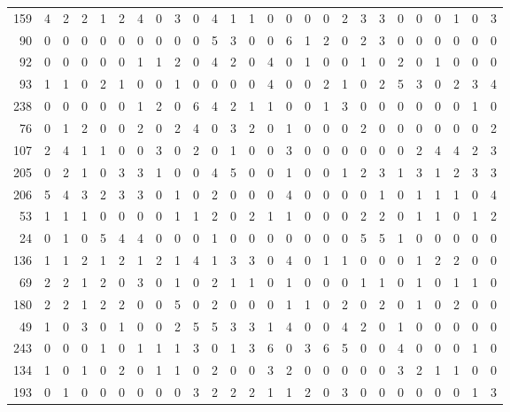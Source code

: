 \begin{longtable}{@{\extracolsep{\fill}}rccccccccccccccccccccccccc@{}}
159 & 4 & 2 & 2 & 1 & 2 & 4 & 0 & 3 & 0 & 4 & 1 & 1 & 0 & 0 & 0 & 0 & 2 & 3 & 3 & 0 & 0 & 0 & 1 & 0 & 3 \\
90 & 0 & 0 & 0 & 0 & 0 & 0 & 0 & 0 & 0 & 5 & 3 & 0 & 0 & 6 & 1 & 2 & 0 & 2 & 3 & 0 & 0 & 0 & 0 & 0 & 0 \\
92 & 0 & 0 & 0 & 0 & 0 & 1 & 1 & 2 & 0 & 4 & 2 & 0 & 4 & 0 & 1 & 0 & 0 & 1 & 0 & 2 & 0 & 1 & 0 & 0 & 0 \\
93 & 1 & 1 & 0 & 2 & 1 & 0 & 0 & 1 & 0 & 0 & 0 & 0 & 4 & 0 & 0 & 2 & 1 & 0 & 2 & 5 & 3 & 0 & 2 & 3 & 4 \\
238 & 0 & 0 & 0 & 0 & 0 & 1 & 2 & 0 & 6 & 4 & 2 & 1 & 1 & 0 & 0 & 1 & 3 & 0 & 0 & 0 & 0 & 0 & 0 & 1 & 0 \\
76 & 0 & 1 & 2 & 0 & 0 & 2 & 0 & 2 & 4 & 0 & 3 & 2 & 0 & 1 & 0 & 0 & 0 & 2 & 0 & 0 & 0 & 0 & 0 & 0 & 2 \\
107 & 2 & 4 & 1 & 1 & 0 & 0 & 3 & 0 & 2 & 0 & 1 & 0 & 0 & 3 & 0 & 0 & 0 & 0 & 0 & 0 & 2 & 4 & 4 & 2 & 3 \\
205 & 0 & 2 & 1 & 0 & 3 & 3 & 1 & 0 & 0 & 4 & 5 & 0 & 0 & 1 & 0 & 0 & 1 & 2 & 3 & 1 & 3 & 1 & 2 & 3 & 3 \\
206 & 5 & 4 & 3 & 2 & 3 & 3 & 0 & 1 & 0 & 2 & 0 & 0 & 0 & 4 & 0 & 0 & 0 & 0 & 1 & 0 & 1 & 1 & 1 & 0 & 4 \\
53 & 1 & 1 & 1 & 0 & 0 & 0 & 0 & 1 & 1 & 2 & 0 & 2 & 1 & 1 & 0 & 0 & 0 & 2 & 2 & 0 & 1 & 1 & 0 & 1 & 2 \\
24 & 0 & 1 & 0 & 5 & 4 & 4 & 0 & 0 & 0 & 1 & 0 & 0 & 0 & 0 & 0 & 0 & 0 & 5 & 5 & 1 & 0 & 0 & 0 & 0 & 0 \\
136 & 1 & 1 & 2 & 1 & 2 & 1 & 2 & 1 & 4 & 1 & 3 & 3 & 0 & 4 & 0 & 1 & 1 & 0 & 0 & 0 & 1 & 2 & 2 & 0 & 0 \\
69 & 2 & 2 & 1 & 2 & 0 & 3 & 0 & 1 & 0 & 2 & 1 & 1 & 0 & 1 & 0 & 0 & 0 & 1 & 1 & 0 & 1 & 0 & 1 & 1 & 0 \\
180 & 2 & 2 & 1 & 2 & 2 & 0 & 0 & 5 & 0 & 2 & 0 & 0 & 0 & 1 & 1 & 0 & 2 & 0 & 2 & 0 & 1 & 0 & 2 & 0 & 0 \\
49 & 1 & 0 & 3 & 0 & 1 & 0 & 0 & 2 & 5 & 5 & 3 & 3 & 1 & 4 & 0 & 0 & 4 & 2 & 0 & 1 & 0 & 0 & 0 & 0 & 0 \\
243 & 0 & 0 & 0 & 1 & 0 & 1 & 1 & 1 & 3 & 0 & 1 & 3 & 6 & 0 & 3 & 6 & 5 & 0 & 0 & 4 & 0 & 0 & 0 & 1 & 0 \\
134 & 1 & 0 & 1 & 0 & 2 & 0 & 1 & 1 & 0 & 2 & 0 & 0 & 3 & 2 & 0 & 0 & 0 & 0 & 0 & 3 & 2 & 1 & 1 & 0 & 0 \\
193 & 0 & 1 & 0 & 0 & 0 & 0 & 0 & 0 & 3 & 2 & 2 & 2 & 1 & 1 & 2 & 0 & 3 & 0 & 0 & 0 & 0 & 0 & 0 & 1 & 3 \\

\end{longtable}
